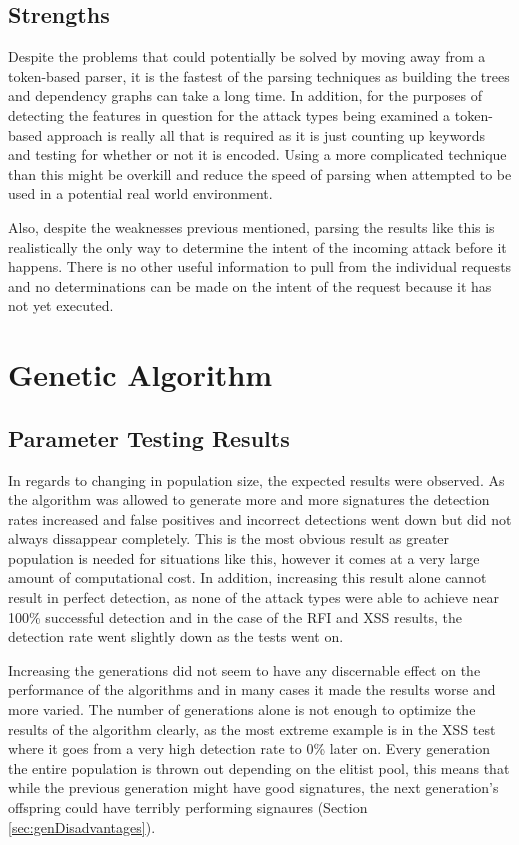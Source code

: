 \subsection{Strengths}

Despite the problems that could potentially be solved by moving away from a token-based parser, it is the fastest of the parsing techniques as building the trees and dependency graphs can take a long time.  In addition, for the purposes of detecting the features in question for the attack types being examined a token-based approach is really all that is required as it is just counting up keywords and testing for whether or not it is encoded.  Using a more complicated technique than this might be overkill and reduce the speed of parsing when attempted to be used in a potential real world environment.

Also, despite the weaknesses previous mentioned, parsing the results like this is realistically the only way to determine the intent of the incoming attack before it happens.  There is no other useful information to pull from the individual requests and no determinations can be made on the intent of the request because it has not yet executed.


\section{Genetic Algorithm}
\subsection{Parameter Testing Results}

In regards to changing in population size, the expected results were observed.  As the algorithm was allowed to generate more and more signatures the detection rates increased and false positives and incorrect detections went down but did not always dissappear completely.  This is the most obvious result as greater population is needed for situations like this, however it comes at a very large amount of computational cost.  In addition, increasing this result alone cannot result in perfect detection, as none of the attack types were able to achieve near 100\% successful detection and in the case of the RFI and XSS results, the detection rate went slightly down as the tests went on.  

Increasing the generations did not seem to have any discernable effect on the performance of the algorithms and in many cases it made the results worse and more varied.  The number of generations alone is not enough to optimize the results of the algorithm clearly, as the most extreme example is in the XSS test where it goes from a very high detection rate to 0\% later on.  Every generation the entire population is thrown out depending on the elitist pool, this means that while the previous generation might have good signatures, the next generation's offspring could have terribly performing signaures (Section \ref{sec:genDisadvantages}).

